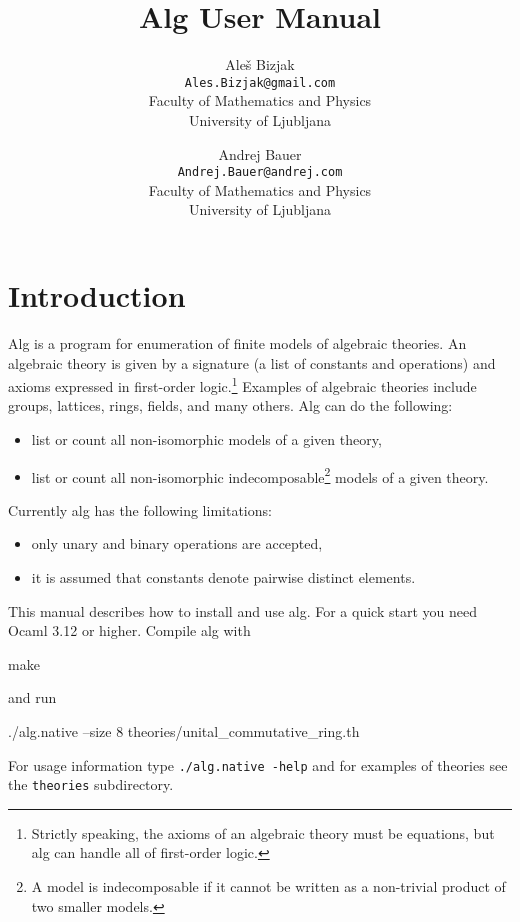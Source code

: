 \documentclass{report}
\begin{document}
\title{Alg User Manual}
\author{Ale\v{s} Bizjak\\
\texttt{Ales.Bizjak@gmail.com}\\
Faculty of Mathematics and Physics\\
University of Ljubljana
\and
Andrej Bauer\\
\texttt{Andrej.Bauer@andrej.com}\\
Faculty of Mathematics and Physics\\
University of Ljubljana}
\maketitle

\dominitoc
\tableofcontents

\chapter{Introduction}
\label{sec:introduction}

Alg is a program for enumeration of finite models of algebraic
theories. An algebraic theory is given by a signature (a list of
constants and operations) and axioms expressed in first-order
logic.\footnote{Strictly speaking, the axioms of an algebraic theory
  must be equations, but alg can handle all of first-order logic.}
Examples of algebraic theories include groups, lattices, rings,
fields, and many others. Alg can do the following:
%
\begin{itemize}
\item list or count all non-isomorphic models of a given theory,
\item list or count all non-isomorphic indecomposable\footnote{A model
  is indecomposable if it cannot be written as a non-trivial product
  of two smaller models.} models of a given theory.
\end{itemize}
%
Currently alg has the following limitations:
%
\begin{itemize}
\item only unary and binary operations are accepted,
\item it is assumed that constants denote pairwise distinct elements.
\end{itemize}
%
This manual describes how to install and use alg. For a quick start
you need Ocaml 3.12 or higher. Compile alg with
%
\begin{shell}
make
\end{shell}
%
and run
%
\begin{shell}
./alg.native --size 8 theories/unital_commutative_ring.th
\end{shell}
%
For usage information type \texttt{./alg.native -help} and for
examples of theories see the \texttt{theories} subdirectory.
\end{document}

